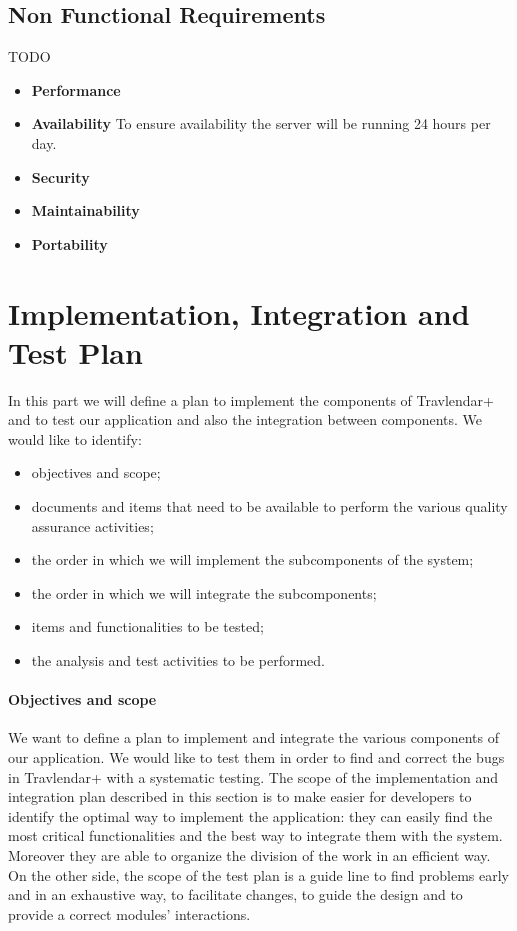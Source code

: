 \documentclass[12pt,titlepage]{article}
\begin{document}
\clearpage
\newpage
\subsection{Non Functional Requirements} TODO
\begin{itemize}
\item \textbf{Performance} 
\item \textbf{Availability} To ensure availability the server will be running 24 hours per day. 
\item \textbf{Security}
\item \textbf{Maintainability}
\item \textbf{Portability}
\end{itemize}

\pagebreak

\section{Implementation, Integration and Test Plan}
In this part we will define a plan to implement the components of Travlendar+ and to test our application and also the integration between components.
We would like to identify:
\begin{itemize}
\item objectives and scope;
\item documents and items that need to be available to perform the various quality assurance activities;
\item the order in which we will implement the subcomponents of the system;
\item the order in which we will integrate the subcomponents;
\item items and functionalities to be tested;
\item  the analysis and test activities to be performed.
\end{itemize}

\paragraph{Objectives and scope}
We want to define a plan to implement and integrate the various components of our application. We would like to test them in order to find and correct the bugs in Travlendar+ with a systematic testing.  
The scope of the implementation and integration plan described in this section is to make easier for developers to identify the optimal way to implement the application: they can easily find the most critical functionalities and the best way to integrate them with the system. Moreover they are able to organize the division of the work in an efficient way.
On the other side, the scope of the test plan is a guide line to find problems early and in an exhaustive way, to facilitate changes, to guide the design and to provide a correct modules' interactions.
\end{document}
